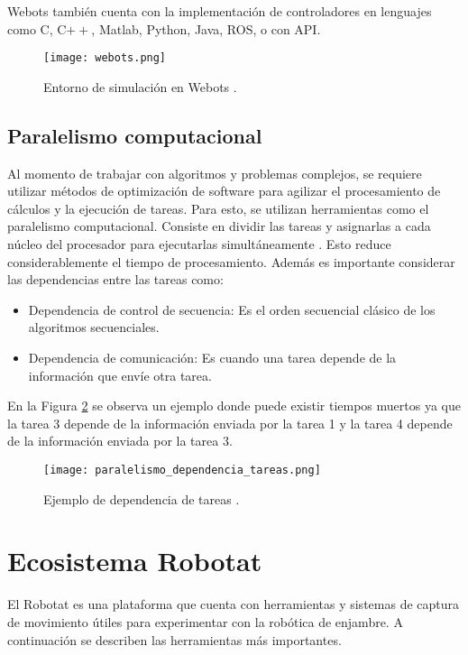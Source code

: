 Webots también cuenta con la implementación de controladores en lenguajes como C, C$++$, Matlab, Python, Java, ROS, o con API.

\begin{figure}[H]
	\centering
	\texttt{[image: webots.png]}
	\caption{Entorno de simulación en Webots \cite{webots}.}
	\label{fig:webots}
\end{figure}

\subsection{Paralelismo computacional}
Al momento de trabajar con algoritmos y problemas complejos, se requiere utilizar métodos de optimización de software para agilizar el procesamiento de cálculos y la ejecución de tareas. 
Para esto, se utilizan herramientas como el paralelismo computacional. Consiste en dividir las tareas y asignarlas a cada núcleo del procesador para ejecutarlas simultáneamente \cite{libro_paralelismo}. Esto reduce considerablemente el tiempo de procesamiento. Además es importante considerar las dependencias entre las tareas como:

\begin{itemize}
	\item Dependencia de control de secuencia: Es el orden secuencial clásico de los algoritmos secuenciales.
	\item Dependencia de comunicación: Es cuando una tarea depende de la información que envíe otra tarea.
\end{itemize}

En la Figura \ref{fig:paralelismo_dependencia_tareas} se observa un ejemplo donde puede existir tiempos muertos ya que la tarea 3 depende de la información enviada por la tarea 1 y la tarea 4 depende de la información enviada por la tarea 3.
\begin{figure}[H]
	\centering
	\texttt{[image: paralelismo\_dependencia\_tareas.png]}
	\caption{Ejemplo de dependencia de tareas \cite{libro_paralelismo}.}
	\label{fig:paralelismo_dependencia_tareas}
\end{figure}

\section{Ecosistema Robotat}
El Robotat es una plataforma que cuenta con herramientas y sistemas de captura de movimiento útiles para experimentar con la robótica de enjambre. A continuación se describen las herramientas más importantes.

